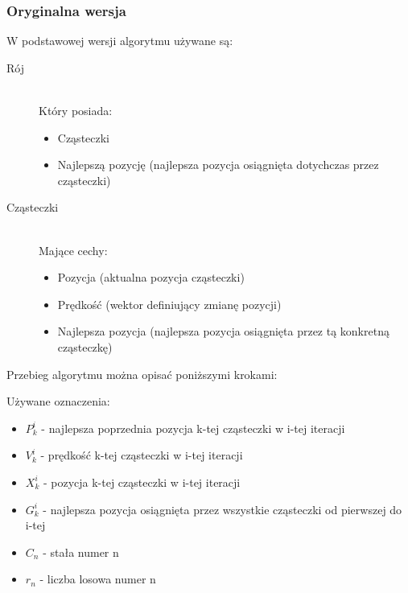 \subsubsection{Oryginalna wersja}
\par W podstawowej wersji algorytmu używane są:
\begin{description}
  \item[Rój] \hfill \\
      Który posiada:
    \begin{itemize}
      \item Cząsteczki 
      \item Najlepszą pozycję (najlepsza pozycja osiągnięta dotychczas przez cząsteczki)
    \end{itemize}
  \item[Cząsteczki] \hfill \\
      Mające cechy:
    \begin{itemize}
      \item Pozycja (aktualna pozycja cząsteczki)
      \item Prędkość (wektor definiujący zmianę pozycji)
      \item Najlepsza pozycja (najlepsza pozycja osiągnięta przez tą konkretną cząsteczkę)
    \end{itemize}
\end{description}
\par Przebieg algorytmu można opisać poniższymi krokami: 
\par Używane oznaczenia: 
\begin{itemize}
  \item $P^{i}_{k}$ - najlepsza poprzednia pozycja k-tej cząsteczki w i-tej iteracji 
  \item $V^{i}_{k}$ - prędkość k-tej cząsteczki w i-tej iteracji 
  \item $X^{i}_{k}$ - pozycja k-tej cząsteczki w i-tej iteracji
  \item $G^{i}_{k}$ - najlepsza pozycja osiągnięta przez wszystkie cząsteczki od pierwszej do i-tej 
  \item $C_{n}$ - stała numer n
  \item $r_{n}$ - liczba losowa numer n

\end{itemize}
